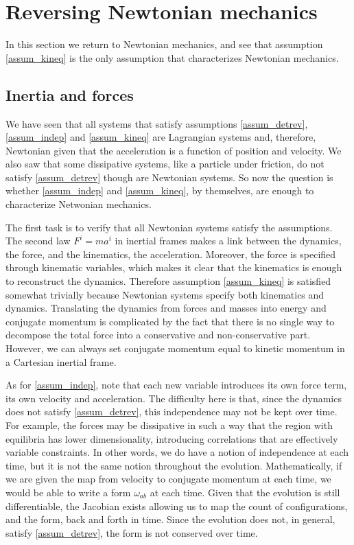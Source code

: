 \section{Reversing Newtonian mechanics}

In this section we return to Newtonian mechanics, and see that assumption \ref{assum_kineq} is the only assumption that characterizes Newtonian mechanics.

\subsection{Inertia and forces}

We have seen that all systems that satisfy assumptions \ref{assum_detrev}, \ref{assum_indep} and \ref{assum_kineq} are Lagrangian systems and, therefore, Newtonian given that the acceleration is a function of position and velocity. We also saw that some dissipative systems, like a particle under friction, do not satisfy \ref{assum_detrev} though are Newtonian systems. So now the question is whether \ref{assum_indep} and \ref{assum_kineq}, by themselves, are enough to characterize Netwonian mechanics.

The first task is to verify that all Newtonian systems satisfy the assumptions. The second law $F^i=ma^i$ in inertial frames makes a link between the dynamics, the force, and the kinematics, the acceleration. Moreover, the force is specified through kinematic variables, which makes it clear that the kinematics is enough to reconstruct the dynamics. Therefore assumption \ref{assum_kineq} is satisfied somewhat trivially because Newtonian systems specify both kinematics and dynamics. Translating the dynamics from forces and masses into energy and conjugate momentum is complicated by the fact that there is no single way to decompose the total force into a conservative and non-conservative part. However, we can always set conjugate momentum equal to kinetic momentum in a Cartesian inertial frame.

As for \ref{assum_indep}, note that each new variable introduces its own force term, its own velocity and acceleration. The difficulty here is that, since the dynamics does not satisfy \ref{assum_detrev}, this independence may not be kept over time. For example, the forces may be dissipative in such a way that the region with equilibria has lower dimensionality, introducing correlations that are effectively variable constraints. In other words, we do have a notion of independence at each time, but it is not the same notion throughout the evolution. Mathematically, if we are given the map from velocity to conjugate momentum at each time, we would be able to write a form $\omega_{ab}$ at each time. Given that the evolution is still differentiable, the Jacobian exists allowing us to map the count of configurations, and the form, back and forth in time. Since the evolution does not, in general, satisfy \ref{assum_detrev}, the form is not conserved over time. 

